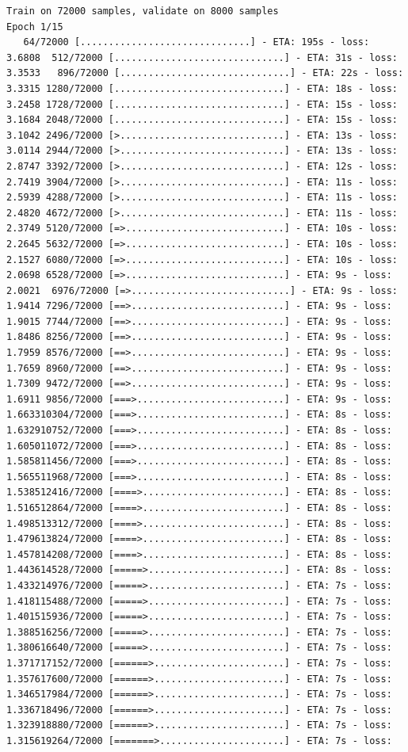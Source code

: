 \documentclass[12pt,fleqn]{article}\usepackage{../../common}
\begin{document}
\begin{verbatim}
Train on 72000 samples, validate on 8000 samples
Epoch 1/15
   64/72000 [..............................] - ETA: 195s - loss: 3.6808  512/72000 [..............................] - ETA: 31s - loss: 3.3533   896/72000 [..............................] - ETA: 22s - loss: 3.3315 1280/72000 [..............................] - ETA: 18s - loss: 3.2458 1728/72000 [..............................] - ETA: 15s - loss: 3.1684 2048/72000 [..............................] - ETA: 15s - loss: 3.1042 2496/72000 [>.............................] - ETA: 13s - loss: 3.0114 2944/72000 [>.............................] - ETA: 13s - loss: 2.8747 3392/72000 [>.............................] - ETA: 12s - loss: 2.7419 3904/72000 [>.............................] - ETA: 11s - loss: 2.5939 4288/72000 [>.............................] - ETA: 11s - loss: 2.4820 4672/72000 [>.............................] - ETA: 11s - loss: 2.3749 5120/72000 [=>............................] - ETA: 10s - loss: 2.2645 5632/72000 [=>............................] - ETA: 10s - loss: 2.1527 6080/72000 [=>............................] - ETA: 10s - loss: 2.0698 6528/72000 [=>............................] - ETA: 9s - loss: 2.0021  6976/72000 [=>............................] - ETA: 9s - loss: 1.9414 7296/72000 [==>...........................] - ETA: 9s - loss: 1.9015 7744/72000 [==>...........................] - ETA: 9s - loss: 1.8486 8256/72000 [==>...........................] - ETA: 9s - loss: 1.7959 8576/72000 [==>...........................] - ETA: 9s - loss: 1.7659 8960/72000 [==>...........................] - ETA: 9s - loss: 1.7309 9472/72000 [==>...........................] - ETA: 9s - loss: 1.6911 9856/72000 [===>..........................] - ETA: 9s - loss: 1.663310304/72000 [===>..........................] - ETA: 8s - loss: 1.632910752/72000 [===>..........................] - ETA: 8s - loss: 1.605011072/72000 [===>..........................] - ETA: 8s - loss: 1.585811456/72000 [===>..........................] - ETA: 8s - loss: 1.565511968/72000 [===>..........................] - ETA: 8s - loss: 1.538512416/72000 [====>.........................] - ETA: 8s - loss: 1.516512864/72000 [====>.........................] - ETA: 8s - loss: 1.498513312/72000 [====>.........................] - ETA: 8s - loss: 1.479613824/72000 [====>.........................] - ETA: 8s - loss: 1.457814208/72000 [====>.........................] - ETA: 8s - loss: 1.443614528/72000 [=====>........................] - ETA: 8s - loss: 1.433214976/72000 [=====>........................] - ETA: 7s - loss: 1.418115488/72000 [=====>........................] - ETA: 7s - loss: 1.401515936/72000 [=====>........................] - ETA: 7s - loss: 1.388516256/72000 [=====>........................] - ETA: 7s - loss: 1.380616640/72000 [=====>........................] - ETA: 7s - loss: 1.371717152/72000 [======>.......................] - ETA: 7s - loss: 1.357617600/72000 [======>.......................] - ETA: 7s - loss: 1.346517984/72000 [======>.......................] - ETA: 7s - loss: 1.336718496/72000 [======>.......................] - ETA: 7s - loss: 1.323918880/72000 [======>.......................] - ETA: 7s - loss: 1.315619264/72000 [=======>......................] - ETA: 7s - loss: 
\end{verbatim}
\end{document}

